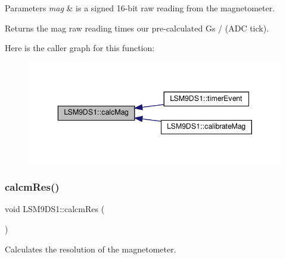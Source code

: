 \begin{DoxyParams}{Parameters}
{\em mag} & is a signed 16-\/bit raw reading from the magnetometer. \\
\hline
\end{DoxyParams}
\begin{DoxyReturn}{Returns}
the mag raw reading times our pre-\/calculated Gs / (A\+DC tick). 
\end{DoxyReturn}
Here is the caller graph for this function\+:
\nopagebreak
\begin{figure}[H]
\begin{center}
\leavevmode
\includegraphics[width=343pt]{classLSM9DS1_a7d0b0740497b1a10cd3e46a282a143ec_icgraph}
\end{center}
\end{figure}
\mbox{\label{classLSM9DS1_a830dfc95c7e2d8524720d78357b053cb}} 
\subsubsection{\texorpdfstring{calcm\+Res()}{calcmRes()}}
{\footnotesize\ttfamily void L\+S\+M9\+D\+S1\+::calcm\+Res (\begin{DoxyParamCaption}{ }\end{DoxyParamCaption})\hspace{0.3cm}{\ttfamily [protected]}}



Calculates the resolution of the magnetometer. 

